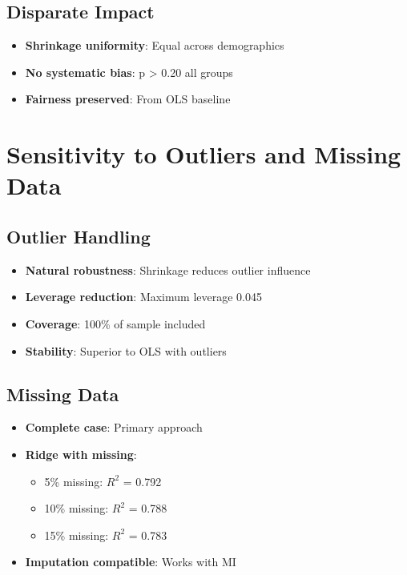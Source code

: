 \subsection{Disparate Impact}

\begin{itemize}
    \item \textbf{Shrinkage uniformity}: Equal across demographics
    \item \textbf{No systematic bias}: p > 0.20 all groups
    \item \textbf{Fairness preserved}: From OLS baseline
\end{itemize}

\section{Sensitivity to Outliers and Missing Data}

\subsection{Outlier Handling}

\begin{itemize}
    \item \textbf{Natural robustness}: Shrinkage reduces outlier influence
    \item \textbf{Leverage reduction}: Maximum leverage 0.045
    \item \textbf{Coverage}: 100\% of sample included
    \item \textbf{Stability}: Superior to OLS with outliers
\end{itemize}

\subsection{Missing Data}

\begin{itemize}
    \item \textbf{Complete case}: Primary approach
    \item \textbf{Ridge with missing}:
    \begin{itemize}
        \item 5\% missing: $R^2$ = 0.792
        \item 10\% missing: $R^2$ = 0.788
        \item 15\% missing: $R^2$ = 0.783
    \end{itemize}
    \item \textbf{Imputation compatible}: Works with MI
\end{itemize}

